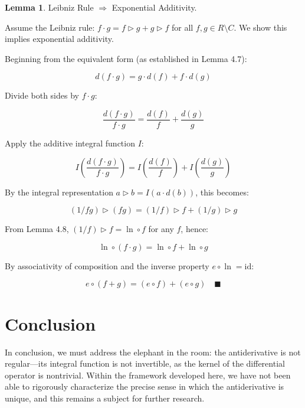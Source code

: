 \documentclass[12pt]{article}
\theoremstyle{definition}
\newtheorem{lemma}[definition]{Lemma}
\begin{document}
\begin{lemma} Leibniz Rule $\Rightarrow$ Exponential Additivity.  

\vspace{5pt}
\noindent Assume the Leibniz rule: $f \cdot g = f \triangleright g + g \triangleright f$ for all $f, g \in R \setminus C$. We show this implies exponential additivity.

\vspace{10pt}
\noindent Beginning from the equivalent form (as established in Lemma 4.7):

\[
d(f \cdot g) = g \cdot d(f) + f \cdot d(g)
\]

\vspace{5pt}
\noindent Divide both sides by $f \cdot g$:

\[
\frac{d(f \cdot g)}{f \cdot g} = \frac{d(f)}{f} + \frac{d(g)}{g}
\]

\vspace{5pt}
\noindent Apply the additive integral function $I$:

\[
I\left(\frac{d(f \cdot g)}{f \cdot g}\right) = I\left(\frac{d(f)}{f}\right) + I\left(\frac{d(g)}{g}\right)
\]

\vspace{5pt}
\noindent By the integral representation $a \triangleright b = I(a \cdot d(b))$, this becomes:

\[
(1/fg) \triangleright (fg) = (1/f) \triangleright f + (1/g) \triangleright g
\]

\vspace{5pt}
\noindent From Lemma 4.8, $(1/f) \triangleright f = \ln \circ f$ for any $f$, hence:

\[
\ln \circ (f \cdot g) = \ln \circ f + \ln \circ g
\]

\vspace{5pt}
\noindent By associativity of composition and the inverse property $e \circ \ln = \mathrm{id}$:  

\[
e \circ (f + g) = (e \circ f) + (e \circ g)\quad \blacksquare
\]

\end{lemma}



\newpage
\section*{Conclusion}

In conclusion, we must address the elephant in the room: the antiderivative is not regular—its integral function is not invertible, as the kernel of the differential operator is nontrivial. Within the framework developed here, we have not been able to rigorously characterize the precise sense in which the antiderivative is unique, and this remains a subject for further research.
\end{document}

